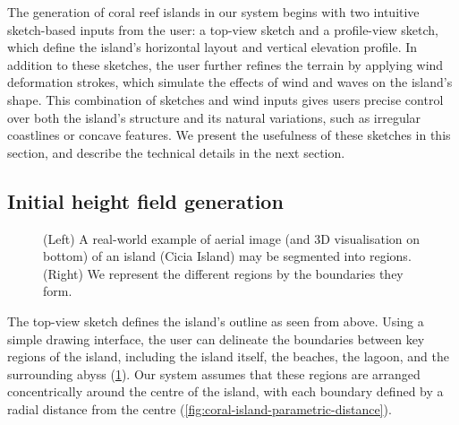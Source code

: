 
The generation of coral reef islands in our system begins with two intuitive sketch-based inputs from the user: a top-view sketch and a profile-view sketch, which define the island's horizontal layout and vertical elevation profile. In addition to these sketches, the user further refines the terrain by applying wind deformation strokes, which simulate the effects of wind and waves on the island's shape. This combination of sketches and wind inputs gives users precise control over both the island's structure and its natural variations, such as irregular coastlines or concave features. We present the usefulness of these sketches in this section, and describe the technical details in the next section.

\subsection{Initial height field generation}
\label{sec:coral-island-generation-initial}

\begin{figure}[H]
    \caption{(Left) A real-world example of aerial image (and 3D visualisation on bottom) of an island (Cicia Island) may be segmented into regions. (Right) We represent the different regions by the boundaries they form.}
    \label{fig:coral-island-top-view-sketch}
\end{figure}

The top-view sketch defines the island's outline as seen from above. Using a simple drawing interface, the user can delineate the boundaries between key regions of the island, including the island itself, the beaches, the lagoon, and the surrounding abyss (\cref{fig:coral-island-top-view-sketch}). Our system assumes that these regions are arranged concentrically around the centre of the island, with each boundary defined by a radial distance from the centre (\cref{fig:coral-island-parametric-distance}).

